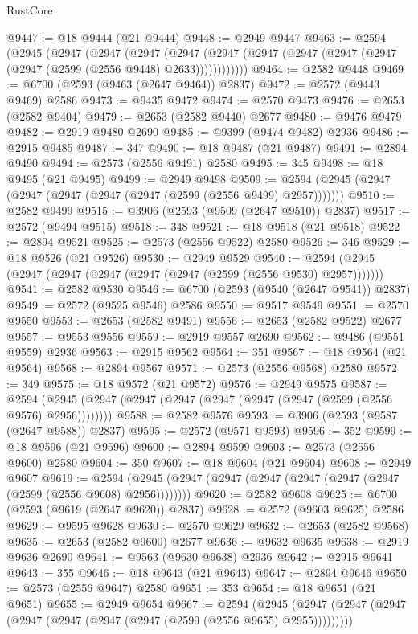 \begin{lexlean}{RustCore}
\begin{coremodule}
@9447 := @18 @9444 (@21 @9444)
@9448 := @2949 @9447
@9463 := @2594
    (@2945
      (@2947
        (@2947
          (@2947
            (@2947 (@2947 (@2947 (@2947 (@2947 (@2947 (@2947 (@2599 (@2556 @9448) @2633))))))))))))
@9464 := @2582 @9448
@9469 := @6700 (@2593 (@9463 (@2647 @9464)) @2837)
@9472 := @2572 (@9443 @9469) @2586
@9473 := @9435 @9472
@9474 := @2570 @9473
@9476 := @2653 (@2582 @9404)
@9479 := @2653 (@2582 @9440) @2677
@9480 := @9476 @9479
@9482 := @2919 @9480 @2690
@9485 := @9399 (@9474 @9482) @2936
@9486 := @2915 @9485
@9487 := 347
@9490 := @18 @9487 (@21 @9487)
@9491 := @2894 @9490
@9494 := @2573 (@2556 @9491) @2580
@9495 := 345
@9498 := @18 @9495 (@21 @9495)
@9499 := @2949 @9498
@9509 := @2594 (@2945 (@2947 (@2947 (@2947 (@2947 (@2947 (@2599 (@2556 @9499) @2957)))))))
@9510 := @2582 @9499
@9515 := @3906 (@2593 (@9509 (@2647 @9510)) @2837)
@9517 := @2572 (@9494 @9515)
@9518 := 348
@9521 := @18 @9518 (@21 @9518)
@9522 := @2894 @9521
@9525 := @2573 (@2556 @9522) @2580
@9526 := 346
@9529 := @18 @9526 (@21 @9526)
@9530 := @2949 @9529
@9540 := @2594 (@2945 (@2947 (@2947 (@2947 (@2947 (@2947 (@2599 (@2556 @9530) @2957)))))))
@9541 := @2582 @9530
@9546 := @6700 (@2593 (@9540 (@2647 @9541)) @2837)
@9549 := @2572 (@9525 @9546) @2586
@9550 := @9517 @9549
@9551 := @2570 @9550
@9553 := @2653 (@2582 @9491)
@9556 := @2653 (@2582 @9522) @2677
@9557 := @9553 @9556
@9559 := @2919 @9557 @2690
@9562 := @9486 (@9551 @9559) @2936
@9563 := @2915 @9562
@9564 := 351
@9567 := @18 @9564 (@21 @9564)
@9568 := @2894 @9567
@9571 := @2573 (@2556 @9568) @2580
@9572 := 349
@9575 := @18 @9572 (@21 @9572)
@9576 := @2949 @9575
@9587 := @2594 (@2945 (@2947 (@2947 (@2947 (@2947 (@2947 (@2947 (@2599 (@2556 @9576) @2956))))))))
@9588 := @2582 @9576
@9593 := @3906 (@2593 (@9587 (@2647 @9588)) @2837)
@9595 := @2572 (@9571 @9593)
@9596 := 352
@9599 := @18 @9596 (@21 @9596)
@9600 := @2894 @9599
@9603 := @2573 (@2556 @9600) @2580
@9604 := 350
@9607 := @18 @9604 (@21 @9604)
@9608 := @2949 @9607
@9619 := @2594 (@2945 (@2947 (@2947 (@2947 (@2947 (@2947 (@2947 (@2599 (@2556 @9608) @2956))))))))
@9620 := @2582 @9608
@9625 := @6700 (@2593 (@9619 (@2647 @9620)) @2837)
@9628 := @2572 (@9603 @9625) @2586
@9629 := @9595 @9628
@9630 := @2570 @9629
@9632 := @2653 (@2582 @9568)
@9635 := @2653 (@2582 @9600) @2677
@9636 := @9632 @9635
@9638 := @2919 @9636 @2690
@9641 := @9563 (@9630 @9638) @2936
@9642 := @2915 @9641
@9643 := 355
@9646 := @18 @9643 (@21 @9643)
@9647 := @2894 @9646
@9650 := @2573 (@2556 @9647) @2580
@9651 := 353
@9654 := @18 @9651 (@21 @9651)
@9655 := @2949 @9654
@9667 := @2594
    (@2945 (@2947 (@2947 (@2947 (@2947 (@2947 (@2947 (@2947 (@2599 (@2556 @9655) @2955)))))))))

\end{coremodule}
\end{lexlean}
